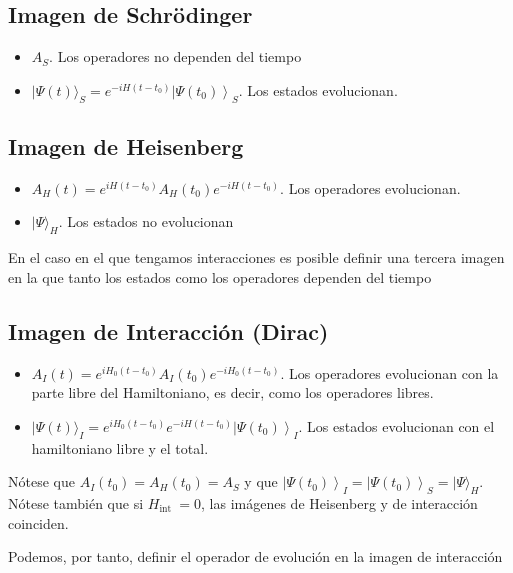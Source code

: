 \subsection{Imagen de Schrödinger}
\begin{itemize}
  \item $A_{S}$. Los operadores no dependen del tiempo
  \item $|\Psi(t)\rangle_{S}=e^{-i H\left(t-t_{0}\right)}\left|\Psi\left(t_{0}\right)\right\rangle_{S}$. Los estados evolucionan.
\end{itemize}
\subsection{Imagen de Heisenberg}
\begin{itemize}
  \item $A_{H}(t)=e^{i H\left(t-t_{0}\right)} A_{H}\left(t_{0}\right) e^{-i H\left(t-t_{0}\right)}$. Los operadores evolucionan.
  \item $|\Psi\rangle_{H}$. Los estados no evolucionan
\end{itemize}

En el caso en el que tengamos interacciones es posible definir una tercera imagen en la que tanto los estados como los operadores dependen del tiempo
\subsection{Imagen de Interacción (Dirac)}
\begin{itemize}
  \item $A_{I}(t)=e^{i H_{0}\left(t-t_{0}\right)} A_{I}\left(t_{0}\right) e^{-i H_{0}\left(t-t_{0}\right)}$. Los operadores evolucionan con la parte libre del Hamiltoniano, es decir, como los operadores libres.
  \item $|\Psi(t)\rangle_{I}=e^{i H_{0}\left(t-t_{0}\right)} e^{-i H\left(t-t_{0}\right)}\left|\Psi\left(t_{0}\right)\right\rangle_{I}$. Los estados evolucionan con el hamiltoniano libre y el total.
\end{itemize}

Nótese que $A_{I}\left(t_{0}\right)=A_{H}\left(t_{0}\right)=A_{S}$ y que $\left|\Psi\left(t_{0}\right)\right\rangle_{I}=\left|\Psi\left(t_{0}\right)\right\rangle_{S}=|\Psi\rangle_{H}$. Nótese también que si $H_{\text {int }}=0$, las imágenes de Heisenberg y de interacción coinciden.

Podemos, por tanto, definir el operador de evolución en la imagen de interacción

